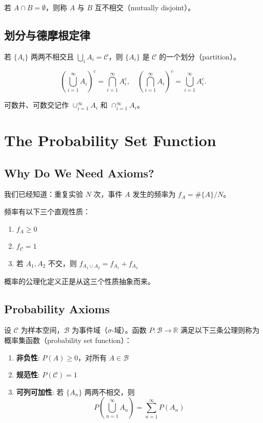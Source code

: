 若 $A \cap B = \emptyset$，则称 $A$ 与 $B$ 互不相交（mutually disjoint）。

\subsection{划分与德摩根定律}\label{sub:partition-demorgan}

若 $\{A_i\}$ 两两不相交且 $\bigcup_i A_i = \mathcal{C}$，则 $\{A_i\}$ 是 $\mathcal{C}$ 的一个划分（partition）。

\begin{Theorem}[德摩根定律]\label{eq:de-morgan}
\[
\left(\bigcup_{i=1}^{\infty} A_i\right)^c = \bigcap_{i=1}^{\infty} A_i^c, \quad
\left(\bigcap_{i=1}^{\infty} A_i\right)^c = \bigcup_{i=1}^{\infty} A_i^c.
\]
\end{Theorem}

可数并、可数交记作 $\cup_{i=1}^{\infty} A_i$ 和 $\cap_{i=1}^{\infty} A_i$。

\section{The Probability Set Function}\label{sec:probability-function}

\subsection{Why Do We Need Axioms?}\label{sub:why-axioms}

我们已经知道：重复实验 $N$ 次，事件 $A$ 发生的频率为 $f_A = \#\{A\} / N$。

频率有以下三个直观性质：
\begin{enumerate}
    \item $f_A \geq 0$
    \item $f_{\mathcal{C}} = 1$
    \item 若 $A_1, A_2$ 不交，则 $f_{A_1 \cup A_2} = f_{A_1} + f_{A_2}$
\end{enumerate}

概率的公理化定义正是从这三个性质抽象而来。

\subsection{Probability Axioms}\label{sub:probability-axioms}

\begin{Definition}[概率集函数]\label{def:probability-set-function}
设 $\mathcal{C}$ 为样本空间，$\mathcal{B}$ 为事件域（$\sigma$-域）。函数 $P: \mathcal{B} \to \mathbb{R}$ 满足以下三条公理则称为概率集函数（probability set function）：

\begin{enumerate}
    \item \textbf{非负性}: $P(A) \geq 0$，对所有 $A \in \mathcal{B}$
    \item \textbf{规范性}: $P(\mathcal{C}) = 1$
    \item \textbf{可列可加性}: 若 $\{A_n\}$ 两两不相交，则
    \[
    P\left(\bigcup_{n=1}^{\infty} A_n\right) = \sum_{n=1}^{\infty} P(A_n)
    \]
\end{enumerate}
\end{Definition}

